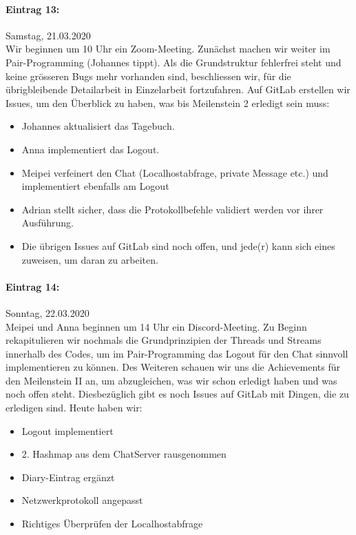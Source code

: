 \documentclass[12pt]{article}
\begin{document}
\paragraph{Eintrag 13:}
Samstag, 21.03.2020\\
Wir beginnen um 10 Uhr ein Zoom-Meeting. Zun\"achst machen wir weiter im Pair-Programming (Johannes tippt). Als die Grundstruktur fehlerfrei steht und keine gr\"osseren Bugs mehr vorhanden sind, beschliessen wir, f\"ur die \"ubrigbleibende Detailarbeit in Einzelarbeit fortzufahren. Auf GitLab erstellen wir Issues, um den \"Uberblick zu haben, was bis Meilenstein 2 erledigt sein muss: 
\begin{itemize} 
\item Johannes aktualisiert das Tagebuch.
\item Anna implementiert das Logout.
\item Meipei verfeinert den Chat (Localhostabfrage, private Message etc.) und implementiert ebenfalls am Logout
\item Adrian stellt sicher, dass die Protokollbefehle validiert werden vor ihrer Ausf\"uhrung.
\item Die \"ubrigen Issues auf GitLab sind noch offen, und jede(r) kann sich eines zuweisen, um daran zu arbeiten.
\end{itemize}

\paragraph{Eintrag 14:}
Sonntag, 22.03.2020\\
Meipei und Anna beginnen um 14 Uhr ein Discord-Meeting. Zu Beginn rekapitulieren wir nochmals die Grundprinzipien der Threads und Streams innerhalb des Codes, um im Pair-Programming das Logout f\"ur den Chat sinnvoll implementieren zu k\"onnen. Des Weiteren schauen wir uns die Achievements f\"ur den Meilenstein II an, um abzugleichen, was wir schon erledigt haben und was noch offen steht. Diesbez\"uglich gibt es noch Issues auf GitLab mit Dingen, die zu erledigen sind.
Heute haben wir:
\begin{itemize}
\item Logout implementiert
\item 2. Hashmap aus dem ChatServer rausgenommen
\item Diary-Eintrag erg\"anzt
\item Netzwerkprotokoll angepasst
\item Richtiges \"Uberpr\"ufen der Localhostabfrage
\end{itemize}
\end{document}
